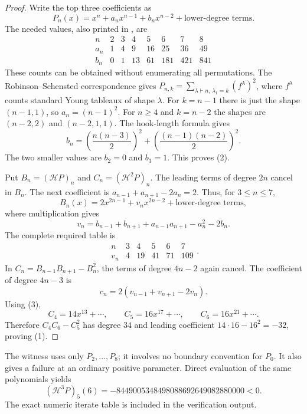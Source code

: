 \documentclass[11pt]{article}
\newcommand{\HH}{\mathcal H}
\begin{document}
\begin{proof}
Write the top three coefficients as
\[
 P_n(x)=x^n+a_nx^{n-1}+b_nx^{n-2}
        +\text{lower-degree terms}.
\]
The needed values, also printed in \cite[pp.~2--3]{Chen}, are
\[
\begin{array}{c|rrrrrrr}
n&2&3&4&5&6&7&8\\\hline
a_n&1&4&9&16&25&36&49\\
b_n&0&1&13&61&181&421&841
\end{array}                                                    \tag{2}
\]
These counts can be obtained without enumerating all permutations.
The Robinson--Schensted correspondence gives
$P_{n,k}=\sum_{\lambda\vdash n,\,\lambda_1=k}(f^\lambda)^2$,
where $f^\lambda$ counts standard Young tableaux of shape $\lambda$.
For $k=n-1$ there is just the shape $(n-1,1)$, so
$a_n=(n-1)^2$. For $n\ge4$ and $k=n-2$ the shapes are
$(n-2,2)$ and $(n-2,1,1)$. The hook-length formula gives
\[
 b_n=\left(\frac{n(n-3)}2\right)^2
       +\left(\frac{(n-1)(n-2)}2\right)^2.
\]
The two smaller values are $b_2=0$ and $b_3=1$. This proves (2).

Put $B_n=(\HH P)_n$ and $C_n=(\HH^2P)_n$.
The leading terms of degree $2n$ cancel in $B_n$. The next
coefficient is
$a_{n-1}+a_{n+1}-2a_n=2$. Thus, for $3\le n\le7$,
\[
 B_n(x)=2x^{2n-1}+v_nx^{2n-2}+\text{lower-degree terms},
\]
where multiplication gives
\[
 v_n=b_{n-1}+b_{n+1}+a_{n-1}a_{n+1}-a_n^2-2b_n.
\]
The complete required table is
\[
 \begin{array}{c|rrrrr}
 n&3&4&5&6&7\\\hline
 v_n&4&19&41&71&109
 \end{array}.                                                 \tag{3}
\]
In $C_n=B_{n-1}B_{n+1}-B_n^2$, the terms of degree $4n-2$
again cancel. The coefficient of degree $4n-3$ is
\[
 c_n=2(v_{n-1}+v_{n+1}-2v_n).
\]
Using (3),
\[
 C_4=14x^{13}+\cdots,\qquad
 C_5=16x^{17}+\cdots,\qquad
 C_6=16x^{21}+\cdots.                                        \tag{4}
\]
Therefore $C_4C_6-C_5^2$ has degree $34$ and leading
coefficient $14\cdot16-16^2=-32$, proving (1).
\end{proof}

The witness uses only $P_2,\ldots,P_8$; it involves no boundary
convention for $P_0$. It also gives a failure at an ordinary
positive parameter. Direct evaluation of the same polynomials yields
\[
 (\HH^3P)_5(6)=-8449005348498088692649082880000<0.              \tag{5}
\]
The exact numeric iterate table is included in the verification output.
\end{document}
